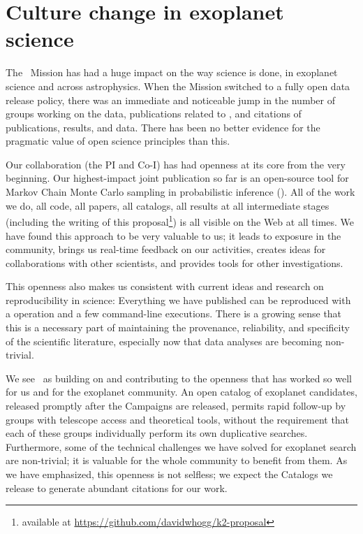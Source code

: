 \documentclass[12pt,preprint]{aastex}
\begin{document}
\section{Culture change in exoplanet science}

The \kepler\ Mission has had a huge impact on the way science is done,
in exoplanet science and across astrophysics.
When the Mission switched to a fully open data release policy, there
was an immediate and noticeable jump in the number of groups working on
the data, publications related to \kepler, and citations of \kepler
publications, results, and data.
There has been no better evidence for the pragmatic value of open
science principles than this.

Our collaboration (the PI and Co-I) has had openness at its core from
the very beginning.
Our highest-impact joint publication so far is an open-source tool for
Markov Chain Monte Carlo sampling in probabilistic inference (\citealt{emcee}).
All of the work we do, all code, all papers, all catalogs, all results
at all intermediate stages (including the writing of this
proposal\footnote{available at
  \url{https://github.com/davidwhogg/k2-proposal}}) is all visible on
the Web at all times.
We have found this approach to be very valuable to us; it leads to
exposure in the community, brings us real-time feedback on our
activities, creates ideas for collaborations with other scientists,
and provides tools for other investigations.

This openness also makes us consistent with current ideas and research
on reproducibility in science:
Everything we have published can be reproduced with a 
operation and a few command-line executions.
There is a growing sense that this is a necessary part of maintaining
the provenance, reliability, and specificity of the scientific literature,
especially now that data analyses are becoming non-trivial.

We see \thecatalog\ as building on and contributing to the openness
that has worked so well for us and for the exoplanet community.
An open catalog of exoplanet candidates, released promptly after
the Campaigns are released, permits rapid follow-up by groups with
telescope access and theoretical tools, without the requirement that
each of these groups individually perform its own duplicative searches.
Furthermore, some of the technical challenges we have solved for
exoplanet search are non-trivial; it is valuable for the whole community
to benefit from them.
As we have emphasized, this openness is not selfless; we expect the
Catalogs we release to generate abundant citations for our work.
\end{document}
